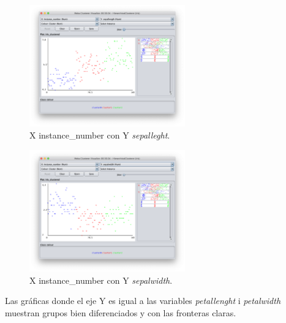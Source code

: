\documentclass[11pt]{exam}
\begin{document}
\begin{questions}
\begin{figure}[h]
	\centering
	\includegraphics[width=0.6\textwidth]{hc_sepallebgth.png}
	\caption{X instance\_number con Y \textit{sepalleght}.}
	\label{Captura_9}
\end{figure}

\begin{figure}[h]
	\centering
	\includegraphics[width=0.6\textwidth]{hc_sepalwidth.png}
	\caption{X instance\_number con Y \textit{sepalwidth}.}
	\label{Captura_10}
\end{figure}

Las gráficas donde el eje Y es igual a las variables \textit{petallenght} i \textit{petalwidth} muestran grupos bien diferenciados y con las fronteras claras.

\end{questions}
\end{document}
